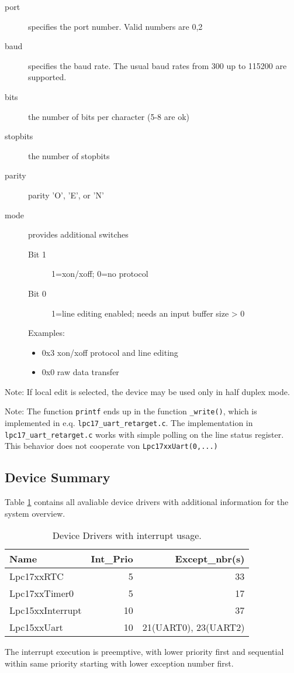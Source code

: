 \begin{description}
\item [port] specifies the port number. Valid numbers are 0,2
\item[baud] specifies the baud rate. The usual baud rates from 300 up to 115200 are supported.
\item[bits] the number of bits per character (5-8 are ok)
\item[stopbits] the number of stopbits
\item[parity] parity 'O', 'E', or 'N'
\item[mode] provides additional switches
   \begin{description}
   \item [Bit 1] 1=xon/xoff; 0=no protocol
   \item [Bit 0] 1=line editing enabled; needs an input buffer size > 0
   \end{description}
   Examples:
   \begin{itemize}
   \item  0x3 xon/xoff protocol and line editing
   \item  0x0 raw data transfer
   \end{itemize}
\end{description}
 
Note: If local edit is selected, the device may be used only in 
half duplex mode.

Note: The function \verb|printf| ends up in the function \verb|_write()|, which
is implemented in e.q. \verb|lpc17_uart_retarget.c|. The implementation
in \verb|lpc17_uart_retarget.c| works with simple polling on the line status
register. This behavior does not cooperate von \verb|Lpc17xxUart(0,...)|

\subsection{Device Summary}
Table \ref{lpc17_device_list} contains all avaliable device drivers 
with additional information for the system overview.

\begin{table}
\begin{tabular}{|l|r|r|}
\hline
Name             & Int\_Prio & Except\_nbr(s) \\
\hline
Lpc17xxRTC       &  5 & 33 \\ 
Lpc17xxTimer0    &  5 &  17 \\
Lpc15xxInterrupt & 10 &  37 \\
Lpc15xxUart      & 10 &  21(UART0), 23(UART2) \\ 
\hline
\end{tabular}
\caption{Device Drivers with interrupt usage.}
\label{lpc17_device_list}
\end{table}

The interrupt execution is preemptive, with lower priority first and 
sequential within same priority starting with lower exception number first.



